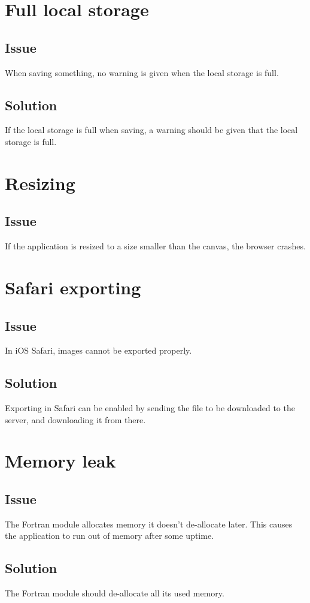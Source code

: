 \section*{Full local storage}

\subsection*{Issue}
When saving something, no warning is given when the local storage is full.

\subsection*{Solution}
If the local storage is full when saving, a warning should be given that the local storage is full.

\section*{Resizing}

\subsection*{Issue}
If the application is resized to a size smaller than the canvas, the browser crashes.

\section*{Safari exporting}

\subsection*{Issue}
In iOS Safari, images cannot be exported properly.

\subsection*{Solution}
Exporting in Safari can be enabled by sending the file to be downloaded to the server, and downloading it from there.

\section*{Memory leak}

\subsection*{Issue}
The Fortran module allocates memory it doesn't de-allocate later. This causes the application to run out of memory after some uptime.

\subsection*{Solution}
The Fortran module should de-allocate all its used memory.
